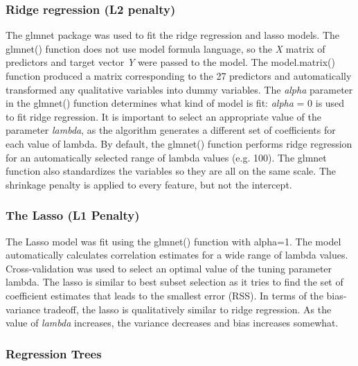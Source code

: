 \documentclass[sigconf]{acmart}
\begin{document}

\subsubsection{Ridge regression (L2 penalty)} 

The glmnet package was used to fit the ridge regression and lasso models. 
The glmnet() function does not use model formula language, so the \textit{X} 
matrix of predictors and target vector \textit{Y} were passed to the model. 
The model.matrix() function produced a matrix corresponding to the 27 predictors 
and automatically transformed any qualitative variables into dummy variables. 
The \textit{alpha} parameter in the glmnet() function determines what kind of 
model is fit: \textit{alpha} = 0 is used to fit ridge regression. It is 
important to select an appropriate value of the parameter \textit{lambda}, 
as the algorithm generates a different set of coefficients for each value of
lambda. By default, the glmnet() function performs ridge regression for an
automatically selected range of lambda values (e.g. 100). The glmnet function 
also standardizes the variables so they are all on the same scale. The 
shrinkage penalty is applied to every feature, but not the intercept. 


\subsubsection{The Lasso (L1 Penalty)} 
 
The Lasso model was fit using the glmnet() function with alpha=1. The model 
automatically calculates correlation estimates for a wide range of lambda 
values. Cross-validation was used to select an optimal value of the tuning 
parameter lambda. The lasso is similar to best subset selection as it tries 
to find the set of coefficient estimates that leads to the smallest error (RSS). 
In terms of the bias-variance tradeoff, the lasso is qualitatively similar to 
ridge regression. As the value of \textit{lambda} increases, the variance
decreases and bias increases somewhat. 


\subsubsection{Regression Trees} 
\end{document}
